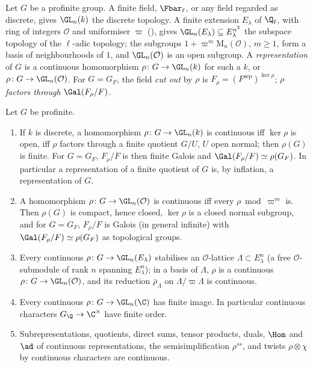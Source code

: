 \begin{definition}\label{def:galois:continuous}
Let $G$ be a profinite group. A finite field, $\Fbar_\ell$, or any field regarded as discrete, gives $\GL_n(k)$ the discrete topology. A finite extension $E_\lambda$ of
$\Q_\ell$, with ring of integers $\mathcal{O}$ and uniformiser $\varpi$ (), gives $\GL_n(E_\lambda)\subseteq E_\lambda^{n^2}$ the subspace topology of the $\ell$-adic topology;
the subgroups $1+\varpi^m\mathrm{M}_n(\mathcal{O})$, $m\ge1$, form a basis of neighbourhoods of $1$, and $\GL_n(\mathcal{O})$ is an open subgroup. A
\emph{representation} of $G$ is a continuous homomorphism $\rho\colon G\to\GL_n(k)$ for such a $k$, or $\rho\colon G\to\GL_n(\mathcal{O})$. For $G=G_F$, the field
\emph{cut out} by $\rho$ is $F_\rho=(F^{\mathrm{sep}})^{\ker\rho}$; $\rho$ \emph{factors through} $\Gal(F_\rho/F)$.
\end{definition}

\begin{proposition}\label{prop:galois:continuous-reps}
Let $G$ be profinite.
\begin{enumerate}[label=(\alph*)]
\item If $k$ is discrete, a homomorphism $\rho\colon G\to\GL_n(k)$ is continuous iff $\ker\rho$ is open, iff $\rho$ factors through a finite quotient $G/U$, $U$ open
normal; then $\rho(G)$ is finite. For $G=G_F$, $F_\rho/F$ is then finite Galois and $\Gal(F_\rho/F)\simeq\rho(G_F)$. In particular a representation of a finite quotient
of $G$ is, by inflation, a representation of $G$.
\item A homomorphism $\rho\colon G\to\GL_n(\mathcal{O})$ is continuous iff every $\rho\bmod\varpi^m$ is. Then $\rho(G)$ is compact, hence closed, $\ker\rho$ is a closed
normal subgroup, and for $G=G_F$, $F_\rho/F$ is Galois (in general infinite) with $\Gal(F_\rho/F)\simeq\rho(G_F)$ as topological groups.
\item Every continuous $\rho\colon G\to\GL_n(E_\lambda)$ stabilises an $\mathcal{O}$-lattice $\Lambda\subset E_\lambda^n$ (a free $\mathcal{O}$-submodule of rank $n$ spanning $E_\lambda^n$);
in a basis of $\Lambda$, $\rho$ is a continuous $\rho\colon G\to\GL_n(\mathcal{O})$, and its reduction $\bar\rho_\Lambda$ on $\Lambda/\varpi\Lambda$ is continuous.
\item Every continuous $\rho\colon G\to\GL_n(\C)$ has finite image. In particular continuous characters $G_\Q\to\C^\times$ have finite order.
\item Subrepresentations, quotients, direct sums, tensor products, duals, $\Hom$ and $\ad$ of continuous representations, the semisimplification $\rho^{ss}$, and
twists $\rho\otimes\chi$ by continuous characters are continuous.
\end{enumerate}
\end{proposition}

